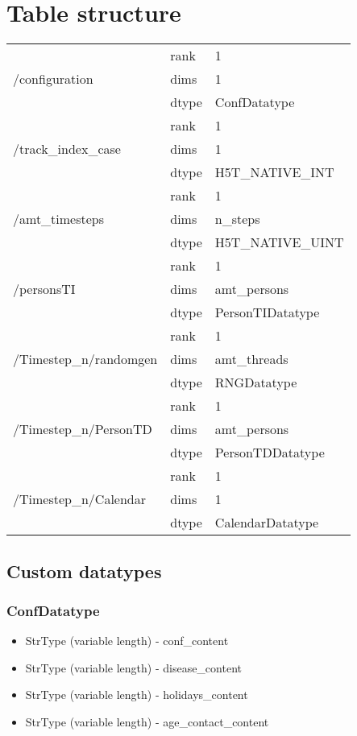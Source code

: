 \section{Table structure}
	\begin{tabular}{ |l|l|l| }
	\hline

	\multirow{3}{*}{/configuration} 
		& rank & 1 \\
		& dims & 1 \\
		& dtype & ConfDatatype \\ \hline

	\multirow{3}{*}{/track\_index\_case} 
		& rank & 1 \\
		& dims & 1 \\
		& dtype & H5T\_NATIVE\_INT \\ \hline

	\multirow{3}{*}{/amt\_timesteps} 
		& rank & 1 \\
		& dims & n\_steps \\
		& dtype & H5T\_NATIVE\_UINT \\ \hline
	
	\multirow{3}{*}{/personsTI} 
		& rank & 1 \\
		& dims & amt\_persons \\
		& dtype & PersonTIDatatype \\ \hline

	\multirow{3}{*}{/Timestep\_n/randomgen} 
		& rank & 1 \\
		& dims & amt\_threads \\
		& dtype & RNGDatatype \\ \hline

	\multirow{3}{*}{/Timestep\_n/PersonTD} 
		& rank & 1 \\
		& dims & amt\_persons \\
		& dtype & PersonTDDatatype \\ \hline

	\multirow{3}{*}{/Timestep\_n/Calendar} 
		& rank & 1 \\
		& dims & 1 \\
		& dtype & CalendarDatatype \\ \hline
	\end{tabular}

	\newpage
	\subsection{Custom datatypes}
		\subsubsection{ConfDatatype}
			\begin{itemize}
				\item StrType (variable length) - conf\_content
				\item StrType (variable length) - disease\_content
				\item StrType (variable length) - holidays\_content
				\item StrType (variable length) - age\_contact\_content
			\end{itemize}

